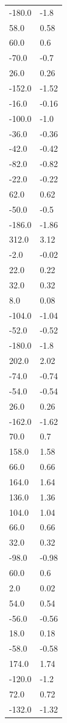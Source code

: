 \begin{longtable}{ll}
-180.0 & -1.8 \\
58.0 & 0.58 \\
60.0 & 0.6 \\
-70.0 & -0.7 \\
26.0 & 0.26 \\
-152.0 & -1.52 \\
-16.0 & -0.16 \\
-100.0 & -1.0 \\
-36.0 & -0.36 \\
-42.0 & -0.42 \\
-82.0 & -0.82 \\
-22.0 & -0.22 \\
62.0 & 0.62 \\
-50.0 & -0.5 \\
-186.0 & -1.86 \\
312.0 & 3.12 \\
-2.0 & -0.02 \\
22.0 & 0.22 \\
32.0 & 0.32 \\
8.0 & 0.08 \\
-104.0 & -1.04 \\
-52.0 & -0.52 \\
-180.0 & -1.8 \\
202.0 & 2.02 \\
-74.0 & -0.74 \\
-54.0 & -0.54 \\
26.0 & 0.26 \\
-162.0 & -1.62 \\
70.0 & 0.7 \\
158.0 & 1.58 \\
66.0 & 0.66 \\
164.0 & 1.64 \\
136.0 & 1.36 \\
104.0 & 1.04 \\
66.0 & 0.66 \\
32.0 & 0.32 \\
-98.0 & -0.98 \\
60.0 & 0.6 \\
2.0 & 0.02 \\
54.0 & 0.54 \\
-56.0 & -0.56 \\
18.0 & 0.18 \\
-58.0 & -0.58 \\
174.0 & 1.74 \\
-120.0 & -1.2 \\
72.0 & 0.72 \\
-132.0 & -1.32 \\

\end{longtable}
